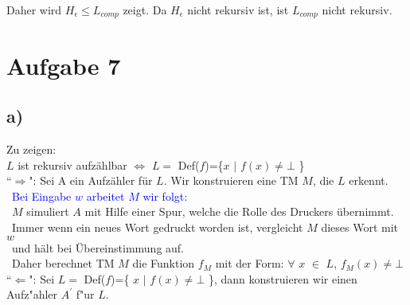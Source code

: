 \documentclass[a4paper,11pt]{scrartcl}
\begin{document}
	Daher wird $H_\epsilon \leq L_{comp}$ zeigt. Da $H_\epsilon$ nicht rekursiv ist, ist $L_{comp}$ nicht rekursiv.
	
	
\section*{Aufgabe 7}
\subsection*{a)}
	Zu zeigen:\\
	$L$ ist rekursiv aufz{\"a}hlbar $\iff$ $L=$ Def($f$)=\{$x$ $|$ $f(x) \ne \bot$ \} \\
	``$\Rightarrow$":  Sei A ein Aufz{\"a}hler f{\"u}r $L$. Wir konstruieren eine TM $M$, die $L$ erkennt.\\
	\indent \indent \  \textcolor{blue} {Bei Eingabe $w$ arbeitet $M$ wir folgt:}\\
	\indent \indent \  $M$ simuliert $A$ mit Hilfe einer Spur, welche die Rolle des Druckers {\"u}bernimmt.\\
	\indent \indent \  Immer wenn ein neues Wort gedruckt worden ist, vergleicht $M$ dieses Wort mit $w$ \\
	\indent \indent \  und h{\"a}lt bei {\"U}bereinstimmung auf.\\
	\indent \indent \  Daher berechnet TM $M$ die Funktion $f_M$ mit der Form: $\forall$ $x$ $\in$ $L$, $f_M(x) \ne \bot$\\	
	``$\Leftarrow$": Sei $L=$ Def($f$)=\{ $x$ $|$ $f(x) \ne \bot$ \}, dann konstruieren wir einen Aufz"ahler $A^{'}$ f"ur $L$.\\
	 
\end{document}
